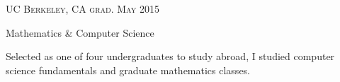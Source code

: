 {\raggedright
  \textsc{\small{UC Berkeley, CA
    \hfill
    {\raggedleft
      grad. May 2015
    }
  }}

  {\raggedright\large {
    Mathematics \& Computer Science
  } \\}

  \normalsize{
    Selected as one of four undergraduates to study abroad, I studied computer science fundamentals and graduate mathematics classes.
  }

  \vspace{8pt}
}
